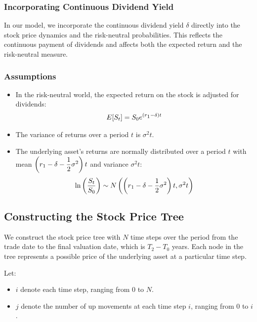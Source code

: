 \documentclass[12pt,a4paper]{article}
\begin{document}
\subsubsection*{Incorporating Continuous Dividend Yield}

In our model, we incorporate the continuous dividend yield \( \delta \) directly into the stock price dynamics and the risk-neutral probabilities. This reflects the continuous payment of dividends and affects both the expected return and the risk-neutral measure.

\subsubsection*{Assumptions}

\begin{itemize}
    \item In the risk-neutral world, the expected return on the stock is adjusted for dividends:
    \[
    E[S_t] = S_0 e^{(r\textsubscript{1} - \delta) t}
    \]
    \item The variance of returns over a period \( t \) is \( \sigma^2 t \).
    \item The underlying asset's returns are normally distributed over a period \( t \) with mean \( \left(r\textsubscript{1} - \delta - \dfrac{1}{2} \sigma^2\right) t \) and variance \( \sigma^2 t \):
    \[
    \ln\left(\dfrac{S_t}{S_0}\right) \sim N\left(\left(r\textsubscript{1} - \delta - \dfrac{1}{2} \sigma^2\right) t, \sigma^2 t\right)
    \]
\end{itemize}

\subsection*{Constructing the Stock Price Tree}

We construct the stock price tree with \( N \) time steps over the period from the trade date to the final valuation date, which is \( T_2 - T_0 \) years. Each node in the tree represents a possible price of the underlying asset at a particular time step.

Let:

\begin{itemize}
    \item \( i \) denote each time step, ranging from \( 0 \) to \( N \).
    \item \( j \) denote the number of up movements at each time step \( i \), ranging from \( 0 \) to \( i\).
\end{itemize}
\end{document}
